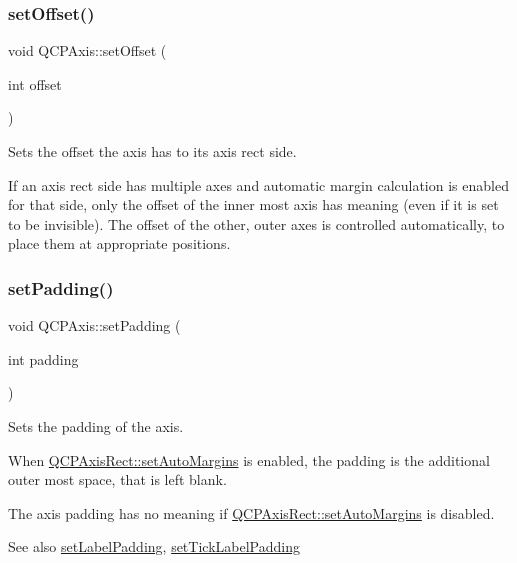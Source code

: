 \subsubsection{\texorpdfstring{set\+Offset()}{setOffset()}}
{\footnotesize\ttfamily void Q\+C\+P\+Axis\+::set\+Offset (\begin{DoxyParamCaption}\item[{int}]{offset }\end{DoxyParamCaption})}

Sets the offset the axis has to its axis rect side.

If an axis rect side has multiple axes and automatic margin calculation is enabled for that side, only the offset of the inner most axis has meaning (even if it is set to be invisible). The offset of the other, outer axes is controlled automatically, to place them at appropriate positions. \mbox{\label{class_q_c_p_axis_a5691441cb3de9e9844855d339c0db279}} 
\subsubsection{\texorpdfstring{set\+Padding()}{setPadding()}}
{\footnotesize\ttfamily void Q\+C\+P\+Axis\+::set\+Padding (\begin{DoxyParamCaption}\item[{int}]{padding }\end{DoxyParamCaption})}

Sets the padding of the axis.

When \hyperlink{class_q_c_p_layout_element_accfda49994e3e6d51ed14504abf9d27d}{Q\+C\+P\+Axis\+Rect\+::set\+Auto\+Margins} is enabled, the padding is the additional outer most space, that is left blank.

The axis padding has no meaning if \hyperlink{class_q_c_p_layout_element_accfda49994e3e6d51ed14504abf9d27d}{Q\+C\+P\+Axis\+Rect\+::set\+Auto\+Margins} is disabled.

\begin{DoxySeeAlso}{See also}
\hyperlink{class_q_c_p_axis_a4391192a766e5d20cfe5cbc17607a7a2}{set\+Label\+Padding}, \hyperlink{class_q_c_p_axis_af302c479af9dbc2e9f0e44e07c0012ee}{set\+Tick\+Label\+Padding} 
\end{DoxySeeAlso}
\mbox{\label{class_q_c_p_axis_aebdfea5d44c3a0ad2b4700cd4d25b641}} 
